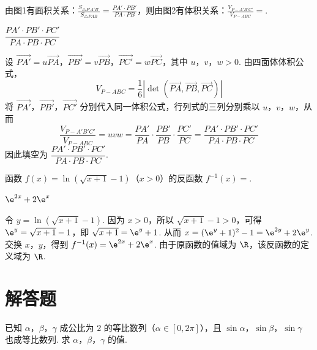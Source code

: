 \begin{problem}
由图1有面积关系：\(\frac{S_{\triangle P'A'B'}}{S_{\triangle PAB}} = \frac{PA' \cdot PB'}{PA \cdot PB}\)，则由图2有体积关系：\(\frac{V_{P-A'B'C'}}{V_{P-ABC}} =\)\fillinblank{}.

\end{problem}

\begin{answer}
\(\dfrac{PA' \cdot PB' \cdot PC'}{PA \cdot PB \cdot PC}\)
\end{answer}

\begin{solution}
设 \(\overrightarrow{PA'}=u\overrightarrow{PA}\)，\(\overrightarrow{PB'}=v\overrightarrow{PB}\)，\(\overrightarrow{PC'}=w\overrightarrow{PC}\)，其中 \(u\)，\(v\)，\(w>0\). 由四面体体积公式，
\[
V_{P-ABC}=\frac{1}{6}\left|\det\left(\overrightarrow{PA},\overrightarrow{PB},\overrightarrow{PC}\right)\right|
\]
将 \(\overrightarrow{PA'}\)，\(\overrightarrow{PB'}\)，\(\overrightarrow{PC'}\) 分别代入同一体积公式，行列式的三列分别乘以 \(u\)，\(v\)，\(w\)，从而
\[
\frac{V_{P-A'B'C'}}{V_{P-ABC}}=uvw=\frac{PA'}{PA}\cdot\frac{PB'}{PB}\cdot\frac{PC'}{PC}=\frac{PA'\cdot PB'\cdot PC'}{PA\cdot PB\cdot PC}
\]
因此填空为 \(\dfrac{PA'\cdot PB'\cdot PC'}{PA\cdot PB\cdot PC}\).
\end{solution}

\begin{problem}
函数 \( f(x) = \ln (\sqrt{x + 1} - 1) \)（\(x > 0\)）的反函数 \( f^{-1}(x) = \)\fillinblank{}.
\end{problem}

\begin{answer}
\(\e^{2x}+2\e^x\)
\end{answer}

\begin{solution}
令 \(y=\ln(\sqrt{x+1}-1)\). 因为 \(x>0\)，所以 \(\sqrt{x+1}-1>0\)，可得 \(\e^y=\sqrt{x+1}-1\)，即 \(\sqrt{x+1}=\e^y+1\). 从而
\(x=(\e^y+1)^2-1=\e^{2y}+2\e^y\).
交换 \(x\)，\(y\)，得到 \(f^{-1}(x)=\e^{2x}+2\e^x\). 由于原函数的值域为 \(\R\)，该反函数的定义域为 \(\R\).
\end{solution}

\section{解答题}
\begin{problem}
已知 \(\alpha\)，\(\beta\)，\(\gamma\) 成公比为 \(2\) 的等比数列（\(\alpha \in [0, 2\pi]\)），且 \(\sin \alpha\)，\(\sin \beta\)，\(\sin \gamma\) 也成等比数列. 求 \(\alpha\)，\(\beta\)，\(\gamma\) 的值.
\end{problem}

